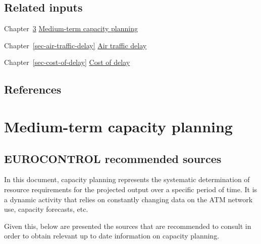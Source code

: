 \documentclass[
  11pt,
  a4paper,
]{book}
\begin{document}
\hypertarget{related-inputs}{%
\section{Related inputs}\label{related-inputs}}

Chapter~\ref{sec-medium-term-capacity-planning}
\protect\hyperlink{sec-medium-term-capacity-planning}{Medium-term
capacity planning}

Chapter~\ref{sec-air-traffic-delay}
\protect\hyperlink{sec-air-traffic-delay}{Air traffic delay}

Chapter~\ref{sec-cost-of-delay}
\protect\hyperlink{sec-cost-of-delay}{Cost of delay}

\hypertarget{references-1}{%
\section{References}\label{references-1}}

\hypertarget{sec-medium-term-capacity-planning}{%
\chapter{Medium-term capacity
planning}\label{sec-medium-term-capacity-planning}}

\hypertarget{eurocontrol-recommended-sources}{%
\section{EUROCONTROL recommended
sources}\label{eurocontrol-recommended-sources}}

In this document, capacity planning represents the systematic
determination of resource requirements for the projected output over a
specific period of time. It is a dynamic activity that relies on
constantly changing data on the ATM network use, capacity forecasts,
etc.

Given this, below are presented the sources that are recommended to
consult in order to obtain relevant up to date information on capacity
planning.
\end{document}
